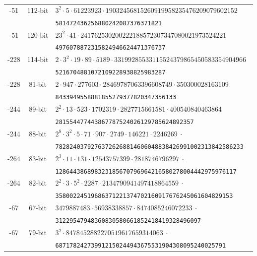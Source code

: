 \documentclass{amsart}
\begin{document}
\begin{table*}[ht]
\begin{tabularx}{\textwidth}{ccl}
       	 -51 &  112-bit & \tt $  3^2 \cdot 5 \cdot 61223923 \cdot 19032456815260919958235476209079602152$  \\
         			&   & \tt   581472436256880242087376371821\\  
       	 -51 &  120-bit & \tt $  23^2 \cdot 41 \cdot 241762530200222188572307347080021973524221$  \\
         			&   & \tt    4976078872315824946624471376737\\  
       	 -228 &  114-bit & \tt $  2 \cdot 3^2 \cdot 19 \cdot 89 \cdot 5189 \cdot 33199285533115524379865450583354904966$  \\
         			&   & \tt    5216704881072109228938825983287\\  
       	 -228 &  81-bit & \tt $  2 \cdot 947 \cdot 277603 \cdot 28469787063396608749 \cdot 350300028163109$  \\
         			&   & \tt    8433949558881855279377820347356133\\  
       	 -244 &  89-bit & \tt $  2^2 \cdot  13 \cdot  523 \cdot  1702319 \cdot  2827715661581 \cdot  400540840463864$  \\
         			&   & \tt     281554477443867787524026129785624892357\\  
       	 -244 &  88-bit & \tt $  2^8 \cdot 3^2 \cdot 5 \cdot 71 \cdot 907 \cdot 2749 \cdot 146221 \cdot 2246269 ~\cdot $  \\
         			&   & \tt     78282403792763726268814606048838426991002313842586233\\  			
       	 -264 &  83-bit & \tt $  2^3 \cdot  11 \cdot  131 \cdot  12543757399 \cdot  2818746796297 ~\cdot  $  \\
         			&   & \tt     128644386898323185670796964216580278004442975976117\\  	
       	 -264 &  82-bit & \tt $  2^2 \cdot 3 \cdot 5^2 \cdot 2287 \cdot 2134790941497418864559 ~\cdot  $  \\
         			&   & \tt   35800224519686371221374702160917676245061604829153\\  
       	 -67 &  67-bit & \tt $  3479887483 \cdot 56938338857 \cdot 8474085246072233 ~\cdot  $  \\
         			&   & \tt   31229547948360830580661852418419328496097\\  			
       	 -67 &  79-bit & \tt $  3^2 \cdot 8478452882270519617659314063 ~\cdot  $  \\
         			&   & \tt   687178242739912150244943675531904308095240025791\\  	

\end{tabularx}
\end{table*}
\end{document}
